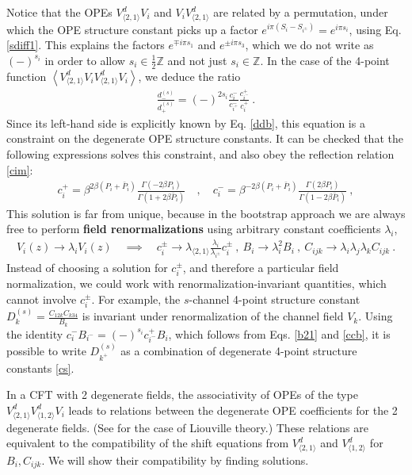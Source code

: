 \documentclass[12pt, a4paper]{article}
\newcommand{\myindex}[1]{\textbf{\boldmath #1}}
\theoremstyle{break}
\begin{document}
Notice that the OPEs $V^d_{\langle 2,1\rangle}V_i$ and $V_iV^d_{\langle 2,1\rangle}$ are related by a permutation, under which the OPE structure constant picks up a factor $e^{i\pi(S_i-S_{i^\pm})} = e^{i\pi s_i}$, using Eq. \eqref{sdiff1}. 
This explains the factors $e^{\mp i\pi s_1}$ and $e^{\pm i\pi s_3}$, which we do not write as $(-)^{s_i}$ in order to allow $s_i\in\frac12\mathbb{Z}$ and not just $s_i\in \mathbb{Z}$.
In the case of the 4-point function $\left<V_{\langle 2,1\rangle}^d V_iV_{\langle 2,1\rangle}^d V_i\right>$, we deduce the ratio 
\begin{align}
 \frac{d^{(s)}_-}{d^{(s)}_+}= (-)^{2s_i}\frac{c_i^-}{c_{i^+}^-} \frac{c_{i^-}^+}{c_i^+}\ .
 \label{ddcccc}
\end{align}
Since its left-hand side is explicitly known by Eq. \eqref{ddb}, this equation is a constraint on the degenerate OPE structure constants.
It can be checked that the following expressions solves this constraint, and also obey the reflection relation \eqref{cim}: 
\begin{align}
 c^+_i = \beta^{2\beta(P_i+\bar P_i)} \frac{\Gamma(-2\beta P_i)}{\Gamma(1+2\beta \bar P_i)} \quad , \quad c^-_i = \beta^{-2\beta(P_i+\bar P_i)} \frac{\Gamma(2\beta P_i)}{\Gamma(1-2\beta \bar P_i)}\ ,
 \label{cpcm}
\end{align}
This solution is far from unique, because in the bootstrap approach we are always free to perform \myindex{field renormalizations} using arbitrary constant coefficients $\lambda_i$,
\begin{align}
 V_i(z) \to \lambda_i V_i(z)\quad \implies \quad c_i^\pm \to \lambda_{\langle 2,1\rangle}\frac{\lambda_i}{\lambda_{i^\pm}}c_i^\pm \ , \  B_i \to \lambda_i^2B_i \ , \ C_{ijk}\to \lambda_i\lambda_j\lambda_k C_{ijk}\ .
 \label{vlv}
\end{align}
Instead of choosing a solution for $c_i^\pm$, and therefore a particular field normalization, 
we could work with renormalization-invariant quantities, which cannot involve $c_i^\pm$. For example, the $s$-channel 4-point structure constant $D^{(s)}_k = \frac{C_{12k}C_{k34}}{B_k}$ is invariant under renormalization of the channel field $V_k$. Using the identity $c_i^- B_{i^-} = (-)^{s_i} c^+_{i^-} B_i$, which follows from Eqs. \eqref{b21} and \eqref{ccb}, it is possible to write $D^{(s)}_{k^+}$ as a combination of degenerate 4-point structure constants \eqref{cs}. 

In a CFT with 2 degenerate fields, the associativity of OPEs of the type 
$V^d_{\langle 2,1\rangle}V^d_{\langle 1,2\rangle}V_i$ leads to relations between 
the degenerate OPE coefficients for the 2 degenerate fields. (See \cite[Exercise 3.2]{rib14} for the case of Liouville theory.) These relations are equivalent to the compatibility of the shift equations from $V^d_{\langle 2,1\rangle}$ and $V^d_{\langle 1,2\rangle}$ for $B_i,C_{ijk}$. We will show their compatibility by finding solutions. 
\end{document}
